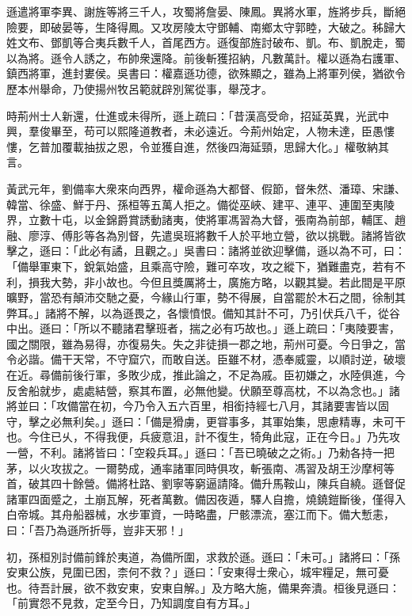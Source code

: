 \begin{pinyinscope}
遜遣將軍李異、謝旌等將三千人，攻蜀將詹晏、陳鳳。異將水軍，旌將步兵，斷絕險要，即破晏等，生降得鳳。又攻房陵太守鄧輔、南鄉太守郭睦，大破之。秭歸大姓文布、鄧凱等合夷兵數千人，首尾西方。遜復部旌討破布、凱。布、凱脫走，蜀以為將。遜令人誘之，布帥衆還降。前後斬獲招納，凡數萬計。權以遜為右護軍、鎮西將軍，進封婁侯。吳書曰：權嘉遜功德，欲殊顯之，雖為上將軍列侯，猶欲令歷本州舉命，乃使揚州牧呂範就辟別駕從事，舉茂才。

時荊州士人新還，仕進或未得所，遜上疏曰：「昔漢高受命，招延英異，光武中興，羣俊畢至，苟可以熙隆道教者，未必遠近。今荊州始定，人物未達，臣愚慺慺，乞普加覆載抽拔之恩，令並獲自進，然後四海延頸，思歸大化。」權敬納其言。

黃武元年，劉備率大衆來向西界，權命遜為大都督、假節，督朱然、潘璋、宋謙、韓當、徐盛、鮮于丹、孫桓等五萬人拒之。備從巫峽、建平、連平、連圍至夷陵界，立數十屯，以金錦爵賞誘動諸夷，使將軍馮習為大督，張南為前部，輔匡、趙融、廖淳、傅肜等各為別督，先遣吳班將數千人於平地立營，欲以挑戰。諸將皆欲擊之，遜曰：「此必有譎，且觀之。」吳書曰：諸將並欲迎擊備，遜以為不可，曰：「備舉軍東下，銳氣始盛，且乘高守險，難可卒攻，攻之縱下，猶難盡克，若有不利，損我大勢，非小故也。今但且獎厲將士，廣施方略，以觀其變。若此間是平原曠野，當恐有顛沛交馳之憂，今緣山行軍，勢不得展，自當罷於木石之間，徐制其弊耳。」諸將不解，以為遜畏之，各懷憤恨。備知其計不可，乃引伏兵八千，從谷中出。遜曰：「所以不聽諸君擊班者，揣之必有巧故也。」遜上疏曰：「夷陵要害，國之關限，雖為易得，亦復易失。失之非徒損一郡之地，荊州可憂。今日爭之，當令必諧。備干天常，不守窟穴，而敢自送。臣雖不材，憑奉威靈，以順討逆，破壞在近。尋備前後行軍，多敗少成，推此論之，不足為戚。臣初嫌之，水陸俱進，今反舍船就步，處處結營，察其布置，必無他變。伏願至尊高枕，不以為念也。」諸將並曰：「攻備當在初，今乃令入五六百里，相銜持經七八月，其諸要害皆以固守，擊之必無利矣。」遜曰：「備是猾虜，更甞事多，其軍始集，思慮精專，未可干也。今住已乆，不得我便，兵疲意沮，計不復生，犄角此寇，正在今日。」乃先攻一營，不利。諸將皆曰：「空殺兵耳。」遜曰：「吾已曉破之之術。」乃勑各持一把茅，以火攻拔之。一爾勢成，通率諸軍同時俱攻，斬張南、馮習及胡王沙摩柯等首，破其四十餘營。備將杜路、劉寧等窮逼請降。備升馬鞍山，陳兵自繞。遜督促諸軍四面蹙之，土崩瓦解，死者萬數。備因夜遁，驛人自擔，燒鐃鎧斷後，僅得入白帝城。其舟船器械，水步軍資，一時略盡，尸骸漂流，塞江而下。備大慙恚，曰：「吾乃為遜所折辱，豈非天邪！」

初，孫桓別討備前鋒於夷道，為備所圍，求救於遜。遜曰：「未可。」諸將曰：「孫安東公族，見圍已困，柰何不救？」遜曰：「安東得士衆心，城牢糧足，無可憂也。待吾計展，欲不救安東，安東自解。」及方略大施，備果奔潰。桓後見遜曰：「前實怨不見救，定至今日，乃知調度自有方耳。」


\end{pinyinscope}
